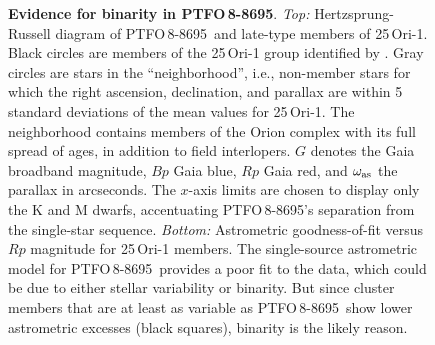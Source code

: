 \documentclass[12pt,twocolumn,tighten]{aastex62}
\newcommand{\ptfo}{PTFO$\,$8-8695}
\begin{document}
\begin{figure}[t]
	\begin{center}
		\leavevmode
		
		\vspace{-0.7cm}
	\end{center}
	\vspace{-0.7cm}
	\caption{ {\bf Evidence for binarity in \ptfo}.
    {\it Top:} Hertzsprung-Russell diagram of \ptfo\ and late-type
    members of 25$\,$Ori-1. Black circles are members of the
    25$\,$Ori-1 group identified by \citet{kounkel_apogee2_2018}.
    Gray circles are stars in the ``neighborhood'', i.e., non-member
    stars for which the right ascension, declination, and parallax are
    within 5 standard deviations of the mean values for 25$\,$Ori-1.
    The neighborhood contains members of the Orion complex with its
    full spread of ages, in addition to field interlopers.  $G$
    denotes the Gaia broadband magnitude, $Bp$ Gaia blue, $Rp$ Gaia
    red, and $\omega_{\rm as}$ the parallax in arcseconds.  The
    $x$-axis limits are chosen to display only the K and M dwarfs,
    accentuating \ptfo's separation from the single-star sequence.
    {\it Bottom:} Astrometric goodness-of-fit versus $Rp$ magnitude
    for 25$\,$Ori-1 members.  The single-source astrometric model for
    \ptfo\ provides a poor fit to the data, which could be due to
    either stellar variability or binarity.  But since cluster members
    that are at least as variable as \ptfo\ show lower astrometric
    excesses (black squares), binarity is the likely reason.
		\label{fig:gaia}
	}
\end{figure}
\end{document}
